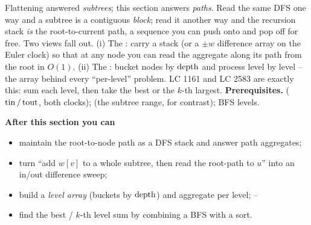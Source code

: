 \begin{topicintro}
Flattening answered \emph{subtrees}; this section answers \emph{paths}. Read the same DFS one
way and a subtree is a contiguous \emph{block}; read it another way and the recursion stack
\emph{is} the root-to-current path, a sequence you can push onto and pop off for free. Two
views fall out. (i) The : carry a stack (or a $\pm w$ difference array on
the Euler clock) so that at any node you can read the aggregate along its path from the root
in $O(1)$. (ii) The : bucket nodes by $\operatorname{depth}$ and process level by
level -- the array behind every ``per-level'' problem. LC 1161 and LC 2583 are exactly this:
sum each level, then take the best or the $k$-th largest.
\textbf{Prerequisites.}  ($\operatorname{tin}/\operatorname{tout}$, both clocks); 
(the subtree range, for contrast);  BFS levels.

\textbf{After this section you can}
\begin{itemize}[nosep]
  \item maintain the root-to-node path as a DFS stack and answer path aggregates; \hfill{}
  \item turn ``add $w[v]$ to a whole subtree, then read the root-path to $u$'' into an
        in/out difference sweep;                                          \hfill{}
  \item build a \emph{level array} (buckets by $\operatorname{depth}$) and aggregate per level;   \hfill{}--
  \item find the best / $k$-th level sum by combining a BFS with a sort.           \hfill{}
\end{itemize}
\end{topicintro}

